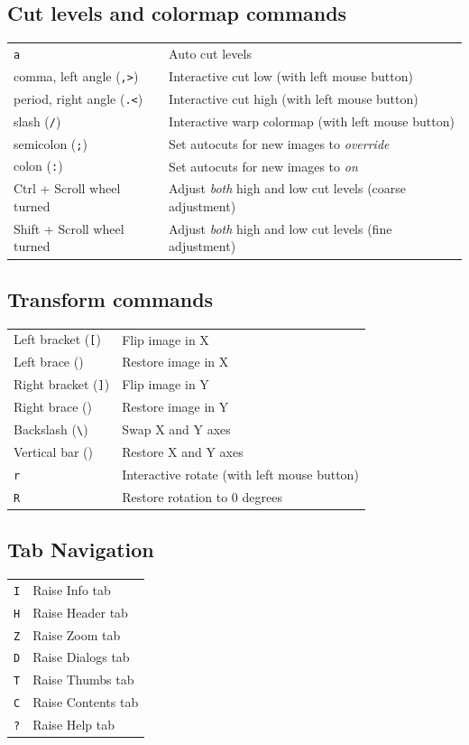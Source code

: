 \documentclass[11pt]{report}
\begin{document}
\subsection{Cut levels and colormap commands}
\begin{tabularx}{\textwidth}{lX}
{\tt a} & Auto cut levels \\
comma, left angle ({\tt ,\textgreater{}}) & Interactive cut low (with left mouse button) \\ 
period, right angle ({\tt .\textless{}}) & Interactive cut high (with left mouse
button) \\ 
slash ({\tt /}) & Interactive warp colormap (with left mouse button) \\
semicolon ({\tt ;}) & Set autocuts for new images to {\em override} \\
colon ({\tt :}) & Set autocuts for new images to {\em on} \\
Ctrl + Scroll wheel turned & Adjust \emph{both} high and low cut levels
(coarse adjustment) \\
Shift + Scroll wheel turned & Adjust \emph{both} high and low cut levels
(fine adjustment) \\
\end{tabularx}

\subsection{Transform commands}
\begin{tabularx}{\textwidth}{lX}
Left bracket ({\tt [}) & Flip image in X \\
Left brace ({\tt \textbraceleft{}}) & Restore image in X \\
Right bracket ({\tt ]}) & Flip image in Y \\
Right brace ({\tt \textbraceright{}}) & Restore image in Y \\
Backslash ({\tt \textbackslash{}}) & Swap X and Y axes \\
Vertical bar ({\tt \textbar{}}) & Restore X and Y axes \\
{\tt r} & Interactive rotate (with left mouse button) \\
{\tt R} & Restore rotation to 0 degrees \\
\end{tabularx}

\subsection{Tab Navigation}
\begin{tabularx}{\textwidth}{lX}
{\tt I} & Raise Info tab \\
{\tt H} & Raise Header tab \\
{\tt Z} & Raise Zoom tab \\
{\tt D} & Raise Dialogs tab \\
{\tt T} & Raise Thumbs tab \\
{\tt C} & Raise Contents tab \\
{\tt ?} & Raise Help tab \\
\end{tabularx}
\end{document}
